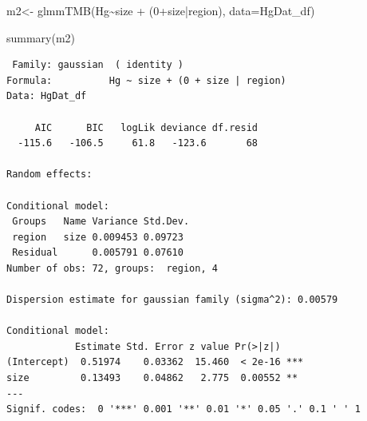 \documentclass[
  letterpaper,
  DIV=11,
  numbers=noendperiod]{scrartcl}
\newenvironment{Shaded}{\begin{snugshade}}{\end{snugshade}}
\newcommand{\AttributeTok}[1]{\textcolor[rgb]{0.40,0.45,0.13}{#1}}
\newcommand{\DecValTok}[1]{\textcolor[rgb]{0.68,0.00,0.00}{#1}}
\newcommand{\FunctionTok}[1]{\textcolor[rgb]{0.28,0.35,0.67}{#1}}
\newcommand{\NormalTok}[1]{\textcolor[rgb]{0.00,0.23,0.31}{#1}}
\newcommand{\OtherTok}[1]{\textcolor[rgb]{0.00,0.23,0.31}{#1}}
\newcommand{\SpecialCharTok}[1]{\textcolor[rgb]{0.37,0.37,0.37}{#1}}
\begin{document}
\begin{Shaded}
\begin{Highlighting}[]
\NormalTok{m2}\OtherTok{\textless{}{-}} \FunctionTok{glmmTMB}\NormalTok{(Hg}\SpecialCharTok{\textasciitilde{}}\NormalTok{size }\SpecialCharTok{+}\NormalTok{ (}\DecValTok{0}\SpecialCharTok{+}\NormalTok{size}\SpecialCharTok{|}\NormalTok{region), }\AttributeTok{data=}\NormalTok{HgDat\_df)}


\FunctionTok{summary}\NormalTok{(m2)}
\end{Highlighting}
\end{Shaded}

\begin{verbatim}
 Family: gaussian  ( identity )
Formula:          Hg ~ size + (0 + size | region)
Data: HgDat_df

     AIC      BIC   logLik deviance df.resid 
  -115.6   -106.5     61.8   -123.6       68 

Random effects:

Conditional model:
 Groups   Name Variance Std.Dev.
 region   size 0.009453 0.09723 
 Residual      0.005791 0.07610 
Number of obs: 72, groups:  region, 4

Dispersion estimate for gaussian family (sigma^2): 0.00579 

Conditional model:
            Estimate Std. Error z value Pr(>|z|)    
(Intercept)  0.51974    0.03362  15.460  < 2e-16 ***
size         0.13493    0.04862   2.775  0.00552 ** 
---
Signif. codes:  0 '***' 0.001 '**' 0.01 '*' 0.05 '.' 0.1 ' ' 1
\end{verbatim}
\end{document}
